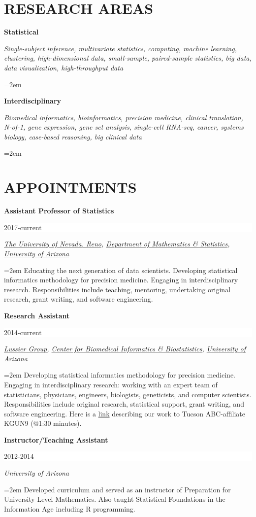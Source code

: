 \documentclass[paper=a4,fontsize=11pt]{scrartcl} %
\newcommand{\sepspace}{\vspace*{1em}}		%
\newcommand{\NewPart}[2]{\section*{\uppercase{#1} #2 }}
\newcommand{\EducationEntry}[4]{
		\noindent \textbf{#1} \hfill      %
		\colorbox{White}{%
			\parbox{6em}{%
			\hfill\color{Black}#2}} \par  %
		\noindent \textit{#3} \par        %
		\noindent\hangindent=2em\hangafter=0 \small #4 %
		\normalsize \par \vspace{-7pt}}
\begin{document}
\NewPart{Research areas}{}
\vspace{-7pt}

\EducationEntry{Statistical}{}{Single-subject inference, multivariate statistics, computing, machine learning, clustering, high-dimensional data, small-sample, paired-sample statistics, big data, data visualization, high-throughput data}{}

\EducationEntry{Interdisciplinary}{}{Biomedical informatics, bioinformatics, precision medicine, clinical translation, N-of-1, gene expression, gene set analysis, single-cell RNA-seq, cancer, systems biology, case-based reasoning, big clinical data}{}

\NewPart{Appointments}{}
\vspace{-7pt}

\EducationEntry{Assistant Professor of Statistics}{2017-current}{{\href{https://www.unr.edu/}{The University of Nevada, Reno}}, {\href{https://www.unr.edu/math/}{Department of Mathematics \& Statistics}}, {\href{http://www.arizona.edu/}{University of Arizona}}}{Educating the next generation of data scientists. Developing statistical informatics methodology for precision medicine. Engaging in interdisciplinary research. Responsibilities include teaching, mentoring, undertaking original research, grant writing, and software engineering.}
\sepspace

\EducationEntry{Research Assistant}{2014-current}{{\href{http://lussierlab.org/}{Lussier Group}}, {\href{http://cb2.uahs.arizona.edu/}{Center for Biomedical Informatics \& Biostatistics}}, {\href{http://www.arizona.edu/}{University of Arizona}}}{Developing statistical informatics methodology for precision medicine. Engaging in interdisciplinary research: working with an expert team of statisticians, physicians, engineers, biologists, geneticists, and computer scientists. Responsibilities include original research, statistical support, grant writing, and software engineering. Here is a \href{http://cb2.uahs.arizona.edu/news/dr-lussier-and-grant-schissler-speak-big-data-kgun9-local-news}{link} describing our work to Tucson ABC-affiliate KGUN9 (@1:30 minutes).}
\sepspace

\EducationEntry{Instructor/Teaching Assistant}{2012-2014}{University of Arizona}
{Developed curriculum and served as an instructor of Preparation for University-Level Mathematics. Also taught Statistical Foundations in the Information Age including \textsc{R} programming.}
\sepspace
\end{document}

